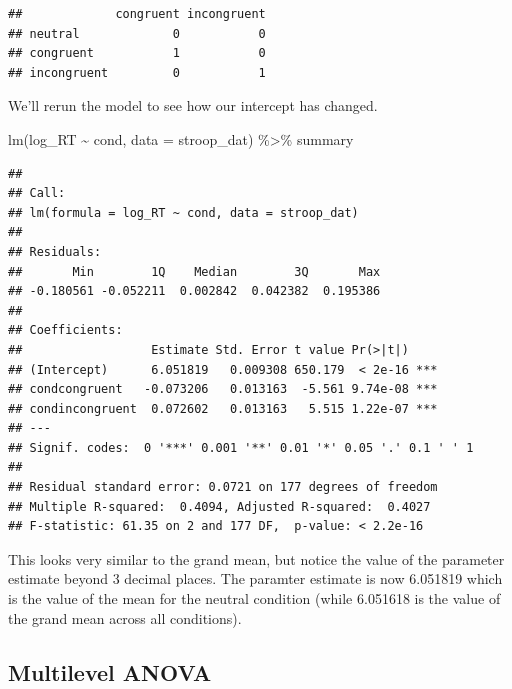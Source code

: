 \documentclass[
]{book}
\newenvironment{Shaded}{\begin{snugshade}}{\end{snugshade}}
\newcommand{\AttributeTok}[1]{\textcolor[rgb]{0.77,0.63,0.00}{#1}}
\newcommand{\FunctionTok}[1]{\textcolor[rgb]{0.00,0.00,0.00}{#1}}
\newcommand{\NormalTok}[1]{#1}
\newcommand{\SpecialCharTok}[1]{\textcolor[rgb]{0.00,0.00,0.00}{#1}}
\begin{document}
\begin{Shaded}
\end{Shaded}

\begin{verbatim}
##             congruent incongruent
## neutral             0           0
## congruent           1           0
## incongruent         0           1
\end{verbatim}

We'll rerun the model to see how our intercept has changed.

\begin{Shaded}
\begin{Highlighting}[]
\FunctionTok{lm}\NormalTok{(log\_RT }\SpecialCharTok{\textasciitilde{}}\NormalTok{ cond, }\AttributeTok{data =}\NormalTok{ stroop\_dat) }\SpecialCharTok{\%\textgreater{}\%}\NormalTok{ summary}
\end{Highlighting}
\end{Shaded}

\begin{verbatim}
## 
## Call:
## lm(formula = log_RT ~ cond, data = stroop_dat)
## 
## Residuals:
##       Min        1Q    Median        3Q       Max 
## -0.180561 -0.052211  0.002842  0.042382  0.195386 
## 
## Coefficients:
##                  Estimate Std. Error t value Pr(>|t|)    
## (Intercept)      6.051819   0.009308 650.179  < 2e-16 ***
## condcongruent   -0.073206   0.013163  -5.561 9.74e-08 ***
## condincongruent  0.072602   0.013163   5.515 1.22e-07 ***
## ---
## Signif. codes:  0 '***' 0.001 '**' 0.01 '*' 0.05 '.' 0.1 ' ' 1
## 
## Residual standard error: 0.0721 on 177 degrees of freedom
## Multiple R-squared:  0.4094, Adjusted R-squared:  0.4027 
## F-statistic: 61.35 on 2 and 177 DF,  p-value: < 2.2e-16
\end{verbatim}

This looks very similar to the grand mean, but notice the value of the parameter estimate beyond 3 decimal places. The paramter estimate is now 6.051819 which is the value of the mean for the neutral condition (while 6.051618 is the value of the grand mean across all conditions).

\hypertarget{multilevel-anova}{%
\subsection{Multilevel ANOVA}\label{multilevel-anova}}
\end{document}
